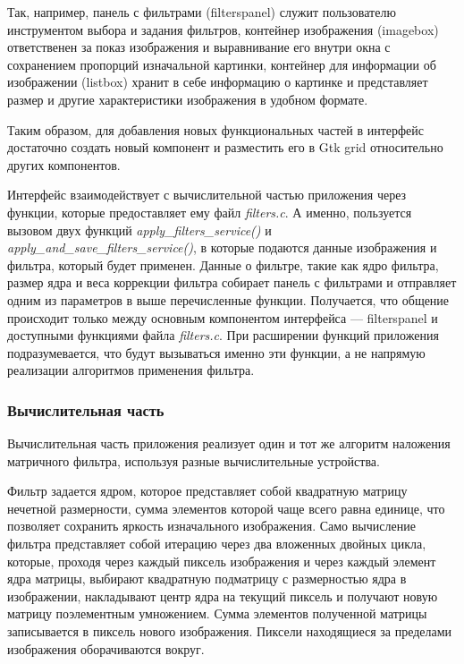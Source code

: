 Так, например, панель с фильтрами (filterspanel) служит пользователю инструментом выбора и задания фильтров, контейнер изображения 
(imagebox) ответственен за показ изображения и выравнивание его внутри окна с сохранением пропорций изначальной картинки, контейнер 
для информации об изображении (listbox) хранит в себе информацию о картинке и представляет размер и другие характеристики изображения 
в удобном формате.

Таким образом, для добавления новых функциональных частей в интерфейс достаточно создать новый компонент и разместить его в Gtk grid 
относительно других компонентов.

Интерфейс взаимодействует с вычислительной частью приложения через функции, которые предоставляет ему файл \textit{filters.c}. 
А именно, пользуется вызовом двух функций \textit{apply\_filters\_service()} и \textit{apply\_and\_save\_filters\_service()}, 
в которые подаются данные изображения и фильтра, который будет применен. Данные о фильтре, такие как ядро фильтра, размер ядра 
и веса коррекции фильтра собирает панель с фильтрами и отправляет одним из параметров в выше перечисленные функции. Получается, 
что общение происходит только между основным компонентом интерфейса --- filterspanel и доступными функциями файла \textit{filters.c}. 
При расширении функций приложения подразумевается, что будут вызываться именно эти функции, а не напрямую реализации алгоритмов применения фильтра.

\subsubsection{Вычислительная часть}
Вычислительная часть приложения реализует один и тот же алгоритм наложения матричного фильтра\cite{filter}, используя разные 
вычислительные устройства.

Фильтр задается ядром, которое представляет собой квадратную матрицу нечетной размерности, сумма элементов которой чаще всего равна 
единице, что позволяет сохранить яркость изначального изображения. Само вычисление фильтра представляет собой итерацию через два вложенных 
двойных цикла, которые, проходя через каждый пиксель изображения и через каждый элемент ядра матрицы, выбирают квадратную подматрицу 
с размерностью ядра в изображении, накладывают центр ядра на текущий пиксель и получают новую матрицу поэлементным умножением. Сумма 
элементов полученной матрицы записывается в пиксель нового изображения. Пиксели находящиеся за пределами изображения оборачиваются вокруг.

